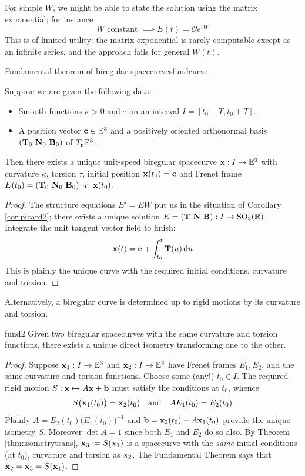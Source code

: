 For simple $W$, we might be able to state the solution using the matrix exponential; for instance
\[
	W\text{ constant }\implies E(t)=\mathcal Oe^{tW}
\] 
This is of limited utility: the matrix exponential is rarely computable except as an infinite series, and the approach fails for general $W(t)$.


\begin{cor}{Fundamental theorem of biregular spacecurves}{fundcurve}\phantom{bob}\par
	Suppose we are given the following data:
	\begin{itemize}
	  \item Smooth functions $\kappa>0$ and $\tau$ on an interval $I=[t_0-T,t_0+T]$.
	  \item A position vector ${\mathbf{c}}\in\mathbb{E}^3$ and a positively oriented orthonormal basis $({\mathbf{T}}_0\ {\mathbf{N}}_0\ {\mathbf{B}}_0)$ of $T_{{\mathbf{c}}}\mathbb{E}^3$.
	\end{itemize}
	Then there exists a unique unit-speed biregular spacecurve ${\mathbf{x}}:I\to\mathbb{E}^3$ with curvature $\kappa$, torsion $\tau$, initial position ${\mathbf{x}}(t_0)={\mathbf{c}}$ and Frenet frame $E(t_0)=(\vT_0\ \vN_0\ \vB_0)$ at ${\mathbf{x}}(t_0)$.
\end{cor}


\begin{proof}
	The structure equations $E'=EW$ put us in the situation of Corollary \ref{cor:picard2}; there exists a unique solution $E=(\vT\ \vN\ \vB):I\to\rSO_3(\R)$. Integrate the unit tangent vector field to finish:
	\[
		{\mathbf{x}}(t)={\mathbf{c}}+\int_{t_0}^t{\mathbf{T}}(u)\,{\mathrm{d} u}
	\]
	This is plainly the unique curve with the required initial conditions, curvature and torsion.
\end{proof}


Alternatively, a biregular curve is determined up to rigid motions by its curvature and torsion.

\begin{cor}{}{fund2}
	Given two biregular spacecurves with the same curvature and torsion functions, there exists a unique direct isometry transforming one to the other.
\end{cor}

\begin{proof}
	Suppose ${\mathbf{x}}_1:I\to\mathbb{E}^3$ and ${\mathbf{x}}_2:I\to\mathbb{E}^3$ have Frenet frames $E_1,E_2$, and the same curvature and torsion functions. Choose some (any!) $t_0\in I$. The required rigid motion $S:{\mathbf{x}}\mapsto A{\mathbf{x}}+{\mathbf{b}}$ must satisfy the conditions at $t_0$, whence\footnotemark
	\[
		S\bigl({\mathbf{x}}_1(t_0)\bigr)={\mathbf{x}}_2(t_0)\quad\text{and}\quad AE_1(t_0)=E_2(t_0)
	\]
	Plainly $A=E_2(t_0)\bigl(E_1(t_0)\bigr)^{-1}$ and ${\mathbf{b}}={\mathbf{x}}_2(t_0)-A{\mathbf{x}}_1(t_0)$ provide the unique isometry $S$. Moreover $\det A=1$ since both $E_1$ and $E_2$ do so also.\smallbreak
	By Theorem \ref{thm:isometrytrans}, ${\mathbf{x}}_3:=S({\mathbf{x}}_1)$ is a spacecurve with the \emph{same} initial conditions (at $t_0$), curvature and torsion as ${\mathbf{x}}_2$. The Fundamental Theorem says that ${\mathbf{x}}_2={\mathbf{x}}_3=S({\mathbf{x}}_1)$.
\end{proof}

